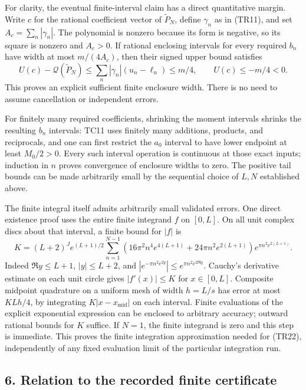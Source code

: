 For clarity, the eventual finite-interval claim has a direct quantitative margin. Write \(c\) for the rational coefficient vector of \(\widetilde P_N\), define \(\gamma_n\) as in (TR11), and set \(A_c=\sum_n|\gamma_n|\). The polynomial is nonzero because its form is negative, so its square is nonzero and \(A_c>0\). If rational enclosing intervals for every required \(b_n\) have width at most \(m/(4A_c)\), then their signed upper bound satisfies \[
U(c)-\mathcal Q(\widetilde P_N)
\le\sum_n|\gamma_n|(u_n-\ell_n)
\le m/4,
\qquad U(c)\le-m/4<0.
\tag{TR22}
\] This proves an explicit sufficient finite enclosure width. There is no need to assume cancellation or independent errors.

For finitely many required coefficients, shrinking the moment intervals shrinks the resulting \(b_n\) intervals: TC11 uses finitely many additions, products, and reciprocals, and one can first restrict the \(a_0\) interval to have lower endpoint at least \(M_0/2>0\). Every such interval operation is continuous at those exact inputs; induction in \(n\) proves convergence of enclosure widths to zero. The positive tail bounds can be made arbitrarily small by the sequential choice of \(L,N\) established above.

The finite integral itself admits arbitrarily small validated errors. One direct existence proof uses the entire finite integrand \(f\) on \([0,L]\). On all unit complex discs about that interval, a finite bound for \(|f|\) is \[
K=(L+2)^J e^{(L+1)/2}
\sum_{n=1}^{N-1}
\left(16\pi^2n^4e^{4(L+1)}+24\pi n^2e^{2(L+1)}\right)
e^{\pi n^2e^{2(L+1)}}.
\tag{TR23}
\] Indeed \(\Re y\le L+1\), \(|y|\le L+2\), and \(|e^{-\pi n^2e^{2y}}|\le e^{\pi n^2e^{2\Re y}}\). Cauchy's derivative estimate on each unit circle gives \(|f'(x)|\le K\) for \(x\in[0,L]\). Composite midpoint quadrature on a uniform mesh of width \(h=L/s\) has error at most \(KLh/4\), by integrating \(K|x-x_{\mathrm{mid}}|\) on each interval. Finite evaluations of the explicit exponential expression can be enclosed to arbitrary accuracy; outward rational bounds for \(K\) suffice. If \(N=1\), the finite integrand is zero and this step is immediate. This proves the finite integration approximation needed for (TR22), independently of any fixed evaluation limit of the particular integration run.

\subsection{6. Relation to the recorded finite certificate}\label{relation-to-the-recorded-finite-certificate}

